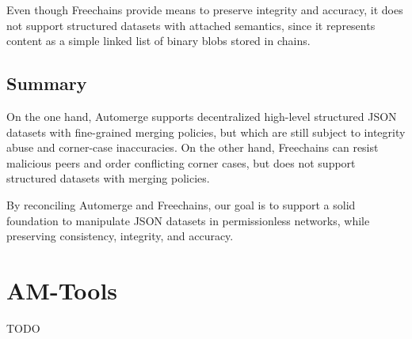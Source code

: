 \documentclass[12pt]{article}
\begin{document}
Even though Freechains provide means to preserve integrity and accuracy, it
does not support structured datasets with attached semantics, since it
represents content as a simple linked list of binary blobs stored in chains.

\subsection{Summary}

On the one hand, Automerge supports decentralized high-level structured JSON
datasets with fine-grained merging policies, but which are still subject to
integrity abuse and corner-case inaccuracies.
%
On the other hand, Freechains can resist malicious peers and order conflicting
corner cases, but does not support structured datasets with merging policies.

By reconciling Automerge and Freechains, our goal is to support a solid
foundation to manipulate JSON datasets in permissionless networks, while
preserving consistency, integrity, and accuracy.

\section{AM-Tools}
\label{sec.amtools}

TODO



\end{document}
